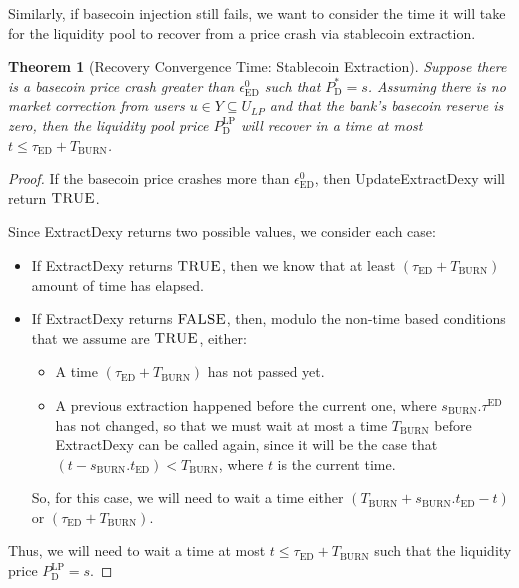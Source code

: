 \documentclass{ifcolog}
\newcommand{\Pdt}{P_{\mathrm{D}}^{*}}
\newcommand{\Plp}{P_{\mathrm{D}}^{\mathrm{LP}}}
\newcommand{\sburn}{s_{\textrm{BURN}}}
\newcommand{\ulp}{U_{LP}}
\newcommand{\epsilondexyzero}{\epsilon_{\textrm{ED}}^{0}}
\newtheorem{theorem}{Theorem}
\begin{document}
Similarly, if basecoin injection still fails, we want to consider the time it will take for the liquidity pool to recover 
from a price crash via stablecoin extraction.

\begin{theorem}[Recovery Convergence Time: Stablecoin Extraction]
  Suppose there is a basecoin price crash greater than $\epsilondexyzero$ such that $\Pdt = s$. Assuming there is no 
  market correction from users $u \in Y \subseteq \ulp$ and that the bank's basecoin reserve is zero, 
  then the liquidity pool price $\Plp$ will recover in a time at most $t \le \tau_{\textrm{ED}} + T_{\textrm{BURN}}$.
\end{theorem}

\begin{proof}
  If the basecoin price crashes more than $\epsilondexyzero$, then UpdateExtractDexy will return
  $\textsc{TRUE}$.
  
  Since ExtractDexy returns two possible values, we consider each case:
  \begin{itemize}
    \item If ExtractDexy returns $\textsc{TRUE}$, then we know that at least
          $(\tau_{\textrm{ED}} + T_{\textrm{BURN}})$ amount of time has elapsed.
    \item If ExtractDexy returns $\textsc{FALSE}$, then, 
          modulo the non-time based conditions that we assume are $\textsc{TRUE}$, either:
          \begin{itemize}
            \item A time $(\tau_{\textrm{ED}} + T_{\textrm{BURN}})$ has not passed yet.
            \item A previous extraction happened before the current one, where $\sburn.\tau^{\textrm{ED}}$ has not changed,
                  so that we must wait at most a time $T_{\textrm{BURN}}$ before ExtractDexy can be called again,
                  since it will be the case that $(t - \sburn.t_{\textrm{ED}}) < T_{\textrm{BURN}}$, where $t$ is the current time.
          \end{itemize}
          So, for this case, we will need to wait a time either $\left(T_{\textrm{BURN}} + \sburn.t_{\textrm{ED}} - t\right)$ or $\left(\tau_{\textrm{ED}} + T_{\textrm{BURN}}\right)$.
  \end{itemize}
  Thus, we will need to wait a time at most $t \le \tau_{\textrm{ED}} + T_{\textrm{BURN}}$
  such that the liquidity price $\Plp = s$.
\end{proof}
\end{document}
